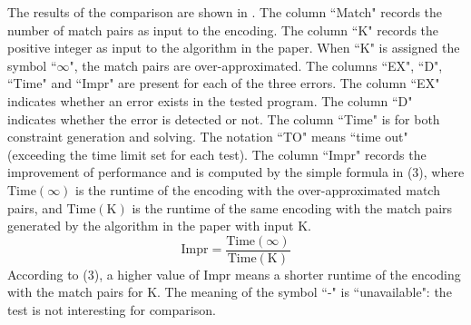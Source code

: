 The results of the comparison are shown in .  
The column ``Match" records the number of match pairs as input to the encoding. The column ``K" records the positive integer as input to the algorithm in the paper. When ``K" is assigned the symbol ``$\infty$", the match pairs are over-approximated. The columns ``EX", ``D", ``Time" and ``Impr" are present for each of the three errors. The column ``EX" indicates whether an error exists in the tested program. The column ``D" indicates whether the error is detected or not. The column ``Time" is for both constraint generation and solving. The notation ``TO" means ``time out" (exceeding the time limit set for each test). The column ``Impr" records the improvement of performance and is computed by the simple formula in (3), where $\mathrm{Time}(\infty)$ is the runtime of the encoding with the over-approximated match pairs, and $\mathrm{Time}(\mathrm{K})$ is the runtime of the same encoding with the match pairs generated by the algorithm in the paper with input K. 
\begin{equation}
\mathrm{Impr} = \frac{\mathrm{Time}(\infty)}{\mathrm{Time}(\mathrm{K})}
\end{equation}
According to (3), a higher value of $\mathrm{Impr}$ means a shorter runtime of the encoding with the match pairs for K.
The meaning of the symbol ``-" is ``unavailable": the test is not interesting for comparison.

